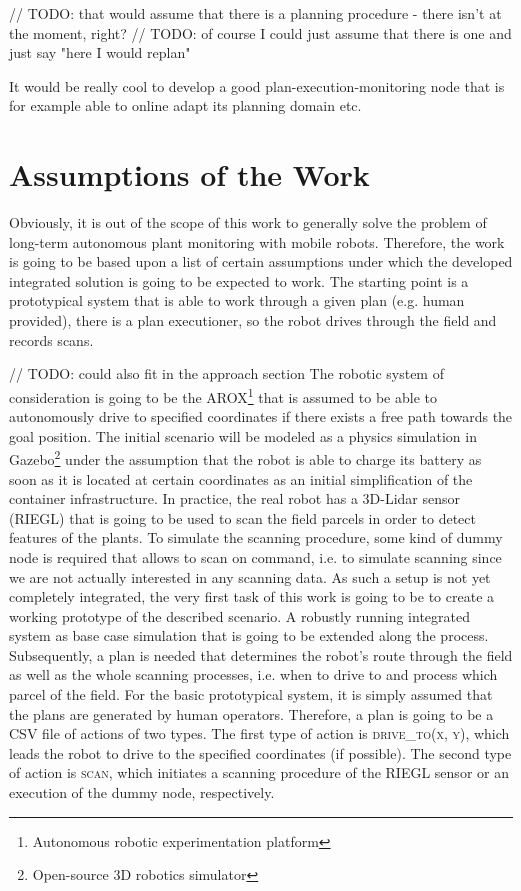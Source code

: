 \documentclass[german, master, expose, latin1]{base/thesis_KBS}
\begin{document}
// TODO: that would assume that there is a planning procedure - there isn't at the moment, right?\newline
// TODO: of course I could just assume that there is one and just say "here I would replan"\newline

It would be really cool to develop a good plan-execution-monitoring node that is for example able to online adapt its planning domain etc.

\section{Assumptions of the Work}

Obviously, it is out of the scope of this work to generally solve the problem of long-term autonomous plant monitoring with mobile robots.
Therefore, the work is going to be based upon a list of certain assumptions under which the developed integrated solution is going to be expected to work.
The starting point is a prototypical system that is able to work through a given plan (e.g. human provided), there is a plan executioner,
so the robot drives through the field and records scans.\newline

// TODO: could also fit in the approach section\newline
The robotic system of consideration is going to be the AROX\footnote{Autonomous robotic experimentation platform} that is assumed to be able to autonomously drive to specified
coordinates if there exists a free path towards the goal position. The initial scenario will be modeled as a physics simulation in Gazebo\footnote{Open-source 3D robotics simulator} 
under the assumption that the robot is able to charge its battery as soon as it is located at certain coordinates as an initial simplification of the container infrastructure.
In practice, the real robot has a 3D-Lidar sensor (RIEGL) that is going to be used to scan the field parcels in order to detect features of the plants.
To simulate the scanning procedure, some kind of dummy node is required that allows to scan on command, i.e. to simulate scanning since we are not actually
interested in any scanning data. As such a setup is not yet completely integrated, the very first task of this work is going to be to create a working prototype of
the described scenario. A robustly running integrated system as base case simulation that is going to be extended along the process.
Subsequently, a plan is needed that determines the robot's route through the field as well as the whole scanning processes, i.e. when to drive to and process which parcel of the field.
For the basic prototypical system, it is simply assumed that the plans are generated by human operators. Therefore, a plan is going to be a CSV file of actions of two types.
The first type of action is \textsc{drive\_to(x, y)}, which leads the robot to drive to the specified coordinates (if possible). The second type of action is \textsc{scan},
which initiates a scanning procedure of the RIEGL sensor or an execution of the dummy node, respectively.\newline
\end{document}
